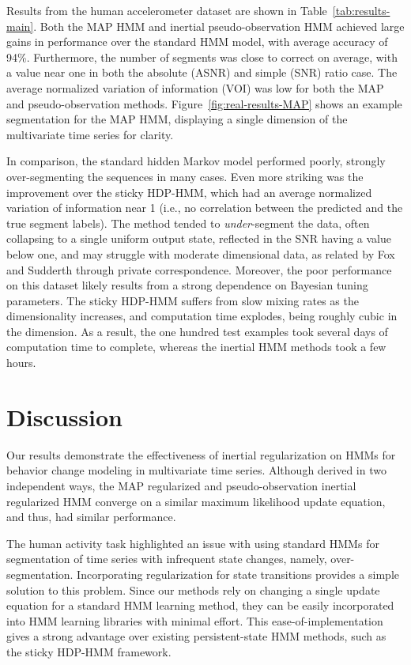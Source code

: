 \documentclass[letterpaper]{article}
\begin{document}
Results from the human accelerometer dataset are shown in
Table~\ref{tab:results-main}. Both the MAP HMM and inertial pseudo-observation
HMM achieved large gains in performance over the standard HMM model, with
average accuracy of 94\%. Furthermore, the number of segments was close to
correct on average, with a value near one in both the absolute (ASNR) and simple (SNR) ratio
case. The average normalized variation of information (VOI) was low for both the MAP and pseudo-observation methods.
Figure~\ref{fig:real-results-MAP} shows an example segmentation for the MAP HMM, displaying a single dimension of the
multivariate time series for clarity.

In comparison, the standard hidden Markov model performed poorly, strongly over-segmenting the 
sequences in many cases. Even more striking was the improvement over the sticky HDP-HMM, which 
had an average normalized variation of information near 1 (i.e., no correlation between
the predicted and the true segment labels). The method tended to
\emph{under}-segment the data, often collapsing to a single uniform output state, reflected in the SNR 
having a value below one, and may struggle with moderate dimensional data, as related by Fox and 
Sudderth through private correspondence. Moreover, the poor performance on this dataset likely results 
from a strong dependence on Bayesian tuning parameters. The sticky HDP-HMM suffers from slow mixing rates as the
dimensionality increases, and computation time explodes, being roughly cubic in
the dimension. As a result, the one hundred test examples took several days of
computation time to complete, whereas the inertial HMM methods took a few hours.

\section{Discussion}

Our results demonstrate the effectiveness of inertial regularization on HMMs for
behavior change modeling in multivariate time series. Although derived in two
independent ways, the MAP regularized and pseudo-observation inertial regularized HMM converge on a
similar maximum likelihood update equation, and thus, had similar performance.

The human activity task highlighted an issue with using standard HMMs for
segmentation of time series with infrequent state changes, namely,
over-segmentation. Incorporating regularization for state transitions provides a
simple solution to this problem. Since our methods rely on changing a single
update equation for a standard HMM learning method, they can be easily
incorporated into HMM learning libraries with minimal effort. This
ease-of-implementation gives a strong advantage over existing persistent-state
HMM methods, such as the sticky HDP-HMM framework.
\end{document}
